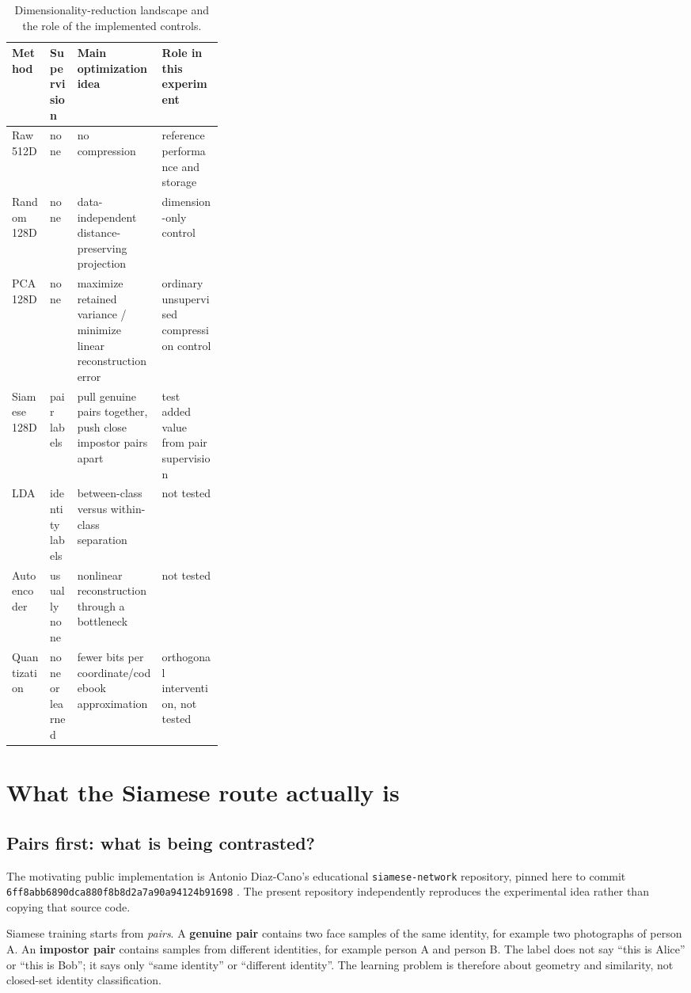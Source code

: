 \documentclass[10pt,a4paper]{article}
\newcommand{\code}[1]{\texttt{#1}}
\begin{document}
\begin{table}[ht]
\centering
\caption{Dimensionality-reduction landscape and the role of the implemented controls.}
\label{tab:methods-landscape}
\small
\begin{tabularx}{\linewidth}{@{}p{0.18\linewidth}p{0.13\linewidth}X X@{}}
\toprule
Method & Supervision & Main optimization idea & Role in this experiment\\
\midrule
Raw 512D & none & no compression & reference performance and storage\\
Random 128D & none & data-independent distance-preserving projection & dimension-only control\\
PCA 128D & none & maximize retained variance / minimize linear reconstruction error & ordinary unsupervised compression control\\
Siamese 128D & pair labels & pull genuine pairs together, push close impostor pairs apart & test added value from pair supervision\\
LDA & identity labels & between-class versus within-class separation & not tested\\
Autoencoder & usually none & nonlinear reconstruction through a bottleneck & not tested\\
Quantization & none or learned & fewer bits per coordinate/codebook approximation & orthogonal intervention, not tested\\
\bottomrule
\end{tabularx}
\end{table}

\section{What the Siamese route actually is}\label{sec:siamese}

\subsection{Pairs first: what is being contrasted?}

The motivating public implementation is Antonio Diaz-Cano's educational
\code{siamese-network} repository, pinned here to commit
\code{6ff8abb6890dca880f8b8d2a7a90a94124b91698} \cite{diazcano2026}. The present repository
independently reproduces the experimental idea rather than copying that source code.

Siamese training starts from \emph{pairs}. A \textbf{genuine pair} contains two face samples
of the same identity, for example two photographs of person A. An \textbf{impostor pair}
contains samples from different identities, for example person A and person B. The label does
not say ``this is Alice'' or ``this is Bob''; it says only ``same identity'' or ``different
identity''. The learning problem is therefore about geometry and similarity, not closed-set
identity classification.
\end{document}
